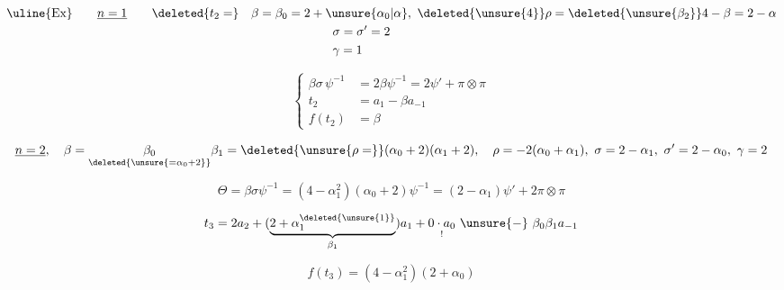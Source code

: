 
\[
\begin{aligned}
\text{\uline{Ex}}\qquad\underline{n=1}\qquad
\deleted{t_2=}\quad
\beta&=\beta_0=2+\unsure{\alpha_0|\alpha},\ \deleted{\unsure{4}}\rho=\deleted{\unsure{\beta_2}}4-\beta=2-\alpha\\
&\hspace{6em}\sigma=\sigma'=2\\
&\hspace{6em}\gamma=1
\end{aligned}
\]

\[
\left\{\begin{aligned}
\beta\sigma\,\psi^{-1}&=2\beta\psi^{-1}=2\psi'+\pi\otimes\pi\\
t_2&=a_1-\beta a_{-1}\\
f(t_2)&=\beta
\end{aligned}\right.
\]

\[
\underline{n=2},\quad
\beta=\underset{\deleted{\unsure{=\alpha_0+2}}}{\beta_0}\beta_1
=\deleted{\unsure{\rho=}}(\alpha_0+2)(\alpha_1+2),\quad
\rho=-2(\alpha_0+\alpha_1),\ \sigma=2-\alpha_1,\ \sigma'=2-\alpha_0,\ \gamma=2
\]

\[
\Theta=\beta\sigma\psi^{-1}=(4-\alpha_1^2)(\alpha_0+2)\psi^{-1}
=(2-\alpha_1)\psi'+2\pi\otimes\pi
\]

\[
t_3=2a_2+(\underbrace{2+\alpha_1^{\deleted{\unsure{1}}}}_{\beta_1})a_1+
 \underset{!}{0\cdot a_0}\ \unsure{-}\ \beta_0\beta_1a_{-1}
\]

\[
f(t_3)=(4-\alpha_1^2)(2+\alpha_0)
\]
